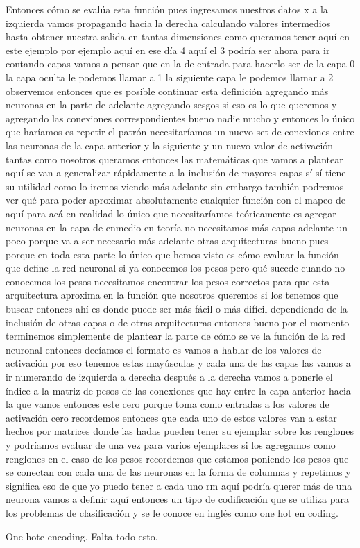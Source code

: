 Entonces cómo se evalúa esta función pues ingresamos nuestros datos x a la izquierda vamos propagando hacia la derecha calculando valores intermedios hasta obtener nuestra salida en tantas dimensiones como queramos tener aquí en este ejemplo por ejemplo aquí en ese día 4 aquí el 3 podría ser ahora para ir contando capas vamos a pensar que en la de entrada para hacerlo ser de la capa 0 la capa oculta le podemos llamar a 1 la siguiente capa le podemos llamar a 2 observemos entonces que es posible continuar esta definición agregando más neuronas en la parte de adelante agregando sesgos si eso es lo que queremos y agregando las conexiones correspondientes bueno nadie mucho y entonces lo único que haríamos es repetir el patrón necesitaríamos un nuevo set de conexiones entre las neuronas de la capa anterior y la siguiente y un nuevo valor de activación tantas como nosotros queramos entonces las matemáticas que vamos a plantear aquí se van a generalizar rápidamente a la inclusión de mayores capas sí sí tiene su utilidad como lo iremos viendo más adelante sin embargo también podremos ver qué para poder aproximar absolutamente cualquier función con el mapeo de aquí para acá en realidad lo único que necesitaríamos teóricamente es agregar neuronas en la capa de enmedio en teoría no necesitamos más capas adelante un poco porque va a ser necesario más adelante otras arquitecturas bueno pues porque en toda esta parte lo único que hemos visto es cómo evaluar la función que define la red neuronal si ya conocemos los pesos pero qué sucede cuando no conocemos los pesos necesitamos encontrar los pesos correctos para que esta arquitectura aproxima en la función que nosotros queremos si los tenemos que buscar entonces ahí es donde puede ser más fácil o más difícil dependiendo de la inclusión de otras capas o de otras arquitecturas entonces bueno por el momento terminemos simplemente de plantear la parte de cómo se ve la función de la red neuronal entonces decíamos el formato es vamos a hablar de los valores de activación por eso tenemos estas mayúsculas y cada una de las capas las vamos a ir numerando de izquierda a derecha después a la derecha vamos a ponerle el índice a la matriz de pesos de las conexiones que hay entre la capa anterior hacia la que vamos entonces este cero porque toma como entradas a los valores de activación cero recordemos entonces que cada uno de estos valores van a estar hechos por matrices donde las hadas pueden tener su ejemplar sobre los renglones y podríamos evaluar de una vez para varios ejemplares si los agregamos como renglones en el caso de los pesos recordemos que estamos poniendo los pesos que se conectan con cada una de las neuronas en la forma de columnas y repetimos y significa eso de que yo puedo tener a cada uno rm aquí podría querer más de una neurona vamos a definir aquí entonces un tipo de codificación que se utiliza para los problemas de clasificación y se le conoce en inglés como one hot en coding.

One hote encoding.
Falta todo esto.
